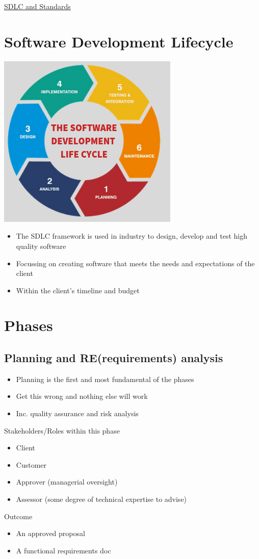 \documentclass{article}[18pt]
\begin{document}
\begin{center}
\underline{\huge SDLC and Standards}
\end{center}
\section{Software Development Lifecycle}
\begin{center}
	\includegraphics[scale=0.7]{Lifecycle}
\end{center}
\begin{itemize}
	\item The SDLC framework is used in industry to design, develop and test high quality software
	\item Focussing on creating software that meets the needs and expectations of the client
	\item Within the client's timeline and budget
\end{itemize}
\section{Phases}
\subsection{Planning and RE(requirements) analysis}
\begin{itemize}
	\item Planning is the first and most fundamental of the phases
	\item Get this wrong and nothing else will work
	\item Inc. quality assurance and risk analysis
\end{itemize}
Stakeholders/Roles within this phase
\begin{itemize}
	\item Client
	\item Customer
	\item Approver (managerial oversight)
	\item Assessor (some degree of technical expertise to advise)
\end{itemize}
Outcome
\begin{itemize}
	\item An approved proposal
	\item A functional requirements doc
\end{itemize}
\end{document}
